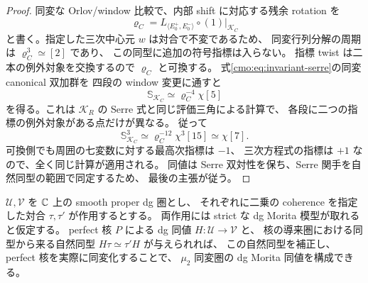 \begin{proof}
同変な Orlov/window 比較で、内部 shift に対応する残余 rotation を
\[
 \varrho_C=L_{\langle E_0^+,E_0^-\rangle}\circ(1)|_{\mathcal K_C}
\]
と書く。指定した三次中心元 $w$ は対合で不変であるため、
同変行列分解の周期は $\varrho_C^3\simeq[2]$ であり、
この同型に追加の符号指標は入らない。
指標 twist は二本の例外対象を交換するので $\varrho_C$ と可換する。
式\eqref{cmo:eq:invariant-serre}の同変 canonical 双加群を
四段の window 変更に通すと
\[
 \mathbb S_{\mathcal K_C}\simeq\varrho_C^{-4}\chi[5]
\]
を得る。これは $\mathcal K_R$ の Serre 式と同じ評価三角による計算で、
各段に二つの指標の例外対象がある点だけが異なる。
従って
\[
 \mathbb S_{\mathcal K_C}^{3}
 \simeq\varrho_C^{-12}\chi^3[15]
 \simeq\chi[7].
\]
可換側でも周囲の七変数に対する最高次指標は $-1$、
三次方程式の指標は $+1$ なので、全く同じ計算が適用される。
同値は Serre 双対性を保ち、Serre 関手を自然同型の範囲で同定するため、
最後の主張が従う。
\end{proof}

\begin{lemma}
\label{cmo:lem:root-order-coherence-square-root}
$\mathcal U,\mathcal V$ を $\mathbb C$ 上の smooth proper dg 圏とし、
それぞれに二乗の coherence を指定した対合 $\tau,\tau'$ が作用するとする。
両作用には strict な dg Morita 模型が取れると仮定する。
perfect 核 $P$ による dg 同値 $H:\mathcal U\to\mathcal V$ と、
核の導来圏における同型から来る自然同型 $H\tau\simeq\tau'H$ が与えられれば、
この自然同型を補正し、perfect 核を実際に同変化することで、
$\mu_2$ 同変圏の dg Morita 同値を構成できる。
\end{lemma}

